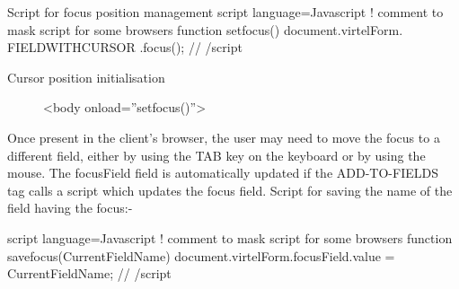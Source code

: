 \documentclass[letterpaper,10pt,english]{sphinxmanual}
\begin{document}
\begin{sphinxVerbatim}[commandchars=\\\{\}]
Script for focus position management
\PYGZlt{}script language=\PYGZdq{}Javascript\PYGZdq{}\PYGZgt{}
\PYGZlt{}!\PYGZhy{}\PYGZhy{} comment to mask script for some browsers
function setfocus()
\PYGZob{}
    document.virtelForm.\PYGZob{}\PYGZob{}\PYGZob{} FIELD\PYGZhy{}WITH\PYGZhy{}CURSOR \PYGZcb{}\PYGZcb{}\PYGZcb{}.focus();
\PYGZcb{}
//\PYGZhy{}\PYGZhy{}\PYGZgt{}
\PYGZlt{}/script\PYGZgt{}
\end{sphinxVerbatim}
\begin{description}
\item[{Cursor position initialisation}] \leavevmode
\textless{}body onload=”setfocus()”\textgreater{}

\end{description}


Once present in the client’s browser, the user may need to move the focus to a different field, either by using the TAB key on the keyboard or by using the mouse. The focusField field is automatically updated if the ADD-TO-FIELDS tag calls a script which updates the focus field. Script for saving the name of the field having the focus:-

\begin{sphinxVerbatim}[commandchars=\\\{\}]
\PYGZlt{}script language=\PYGZdq{}Javascript\PYGZdq{}\PYGZgt{}
\PYGZlt{}!\PYGZhy{}\PYGZhy{} comment to mask script for some browsers
function savefocus(CurrentFieldName)
\PYGZob{}
    document.virtelForm.focusField.value = CurrentFieldName;
\PYGZcb{}
//\PYGZhy{}\PYGZhy{}\PYGZgt{}
\PYGZlt{}/script\PYGZgt{}
\end{sphinxVerbatim}


\begin{sphinxVerbatim}[commandchars=\\\{\}]
     
\end{sphinxVerbatim}

\end{document}
